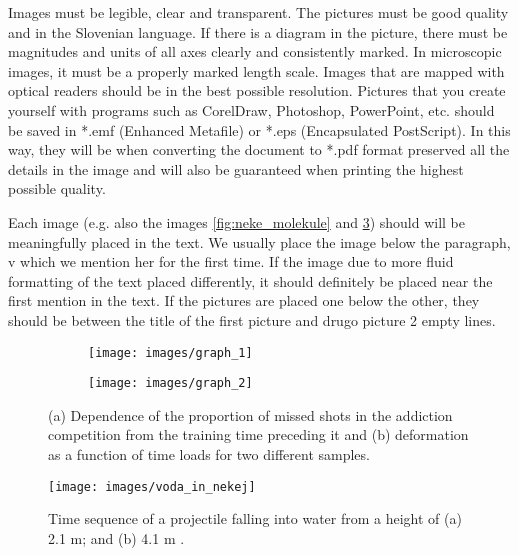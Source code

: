 Images must be legible, clear and transparent. The pictures must be good
quality and in the Slovenian language. If there is a diagram in the picture, there must be magnitudes
and units of all axes clearly and consistently marked. In microscopic images, it must
be a properly marked length scale. Images that are mapped with optical
readers should be in the best possible resolution. Pictures that you create yourself with
programs such as CorelDraw, Photoshop, PowerPoint, etc. should be saved in
*.emf (Enhanced Metafile) or *.eps (Encapsulated
PostScript). In this way, they will be when converting the document to *.pdf format
preserved all the details in the image and will also be guaranteed when printing
the highest possible quality.

Each image (e.g. also the images \ref{fig:neke_molekule} and \ref{fig:2_graph}) should
will be meaningfully placed in the text. We usually place the image below the paragraph, v
which we mention her for the first time. If the image due to more fluid formatting of the text
placed differently, it should definitely be placed near the first mention in the text. If
the pictures are placed one below the other, they should be between the title of the first picture and drugo
picture 2 empty lines.

\begin{figure}
\begin{subfigure}[b]{.45\linewidth}
\centering \texttt{[image: images/graph\_1]}
\caption{}\label{subfig:graph1}
\end{subfigure}%
\quad
\begin{subfigure}[b]{.45\linewidth}
\centering \texttt{[image: images/graph\_2]}
\caption{}\label{subfig:graph2}
\end{subfigure}

\caption{(a) Dependence of the proportion of missed shots in the addiction competition
from the training time preceding it and (b) deformation as a function of time
loads for two different samples.}\label{fig:2_graph}
\end{figure}

\begin{figure}[ht!]
\begin{centering}
\texttt{[image: images/voda\_in\_nekej]}
\caption{Time sequence of a projectile falling into water from a height of (a) 2.1 m;
and (b)
4.1 m \cite{Loukides_2020}.} \label{fig:voda_in_nekej}
\end{centering}
\end{figure}

